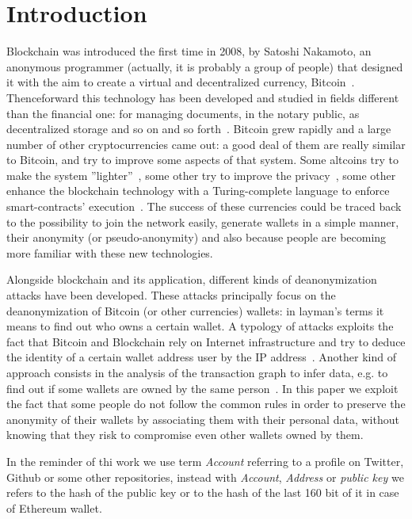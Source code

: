 \section{Introduction}
Blockchain was introduced the first time in 2008, by Satoshi Nakamoto, an
anonymous programmer (actually, it is probably a group of people) that
designed it with the aim to create a virtual and decentralized currency,
Bitcoin~\cite{bib:satoshi}.
Thenceforward this technology has been developed and
studied in fields different than the financial one: for managing documents, in
the notary public, as decentralized storage and so on and so
forth~\cite{bib:air}. Bitcoin grew
rapidly and a large number of other cryptocurrencies came out:
a good deal of them are really
similar to Bitcoin, and try to improve some aspects of that system. Some
altcoins try to make the system ''lighter''~\cite{bib:litecoin:wiki},
some other try to improve the privacy~\cite{bib:zerocoin:white_paper,
bib:zerocash:white_paper,
bib:monero:white_paper}, some other enhance the blockchain technology with a
Turing-complete language to enforce smart-contracts'
execution~\cite{bib:ethereum:whitepaper}.
The success of these
currencies could be traced back to the possibility to join the network easily,
generate wallets in a simple manner,
their anonymity (or pseudo-anonymity) and also because people are
becoming more familiar with these new technologies.


Alongside blockchain and its application, different kinds of deanonymization
attacks have been developed.
These attacks principally focus on the
deanonymization of Bitcoin (or other currencies) wallets: in layman's terms
it means to find out who owns a certain wallet.
A typology of attacks exploits the fact that Bitcoin and Blockchain rely
on Internet infrastructure and try to deduce the identity of a certain wallet
address user by the IP address~\cite{bib:deanon}.
Another kind of approach consists in the analysis of the transaction graph
to infer data, e.g. to find out if some wallets are owned by the same
person~\cite{bib:fistful}.
In this paper we exploit the fact that some people do not follow the common
rules in order to preserve the anonymity of their wallets by associating them
with their personal data, without knowing that they risk to compromise even
other wallets owned by them.

In the reminder of thi work we use term \emph{Account} referring to a profile
on Twitter, Github or some other repositories, instead with \emph{Account},
\emph{Address} or \emph{public key} we refers to the hash of the public key
or to the hash of the last 160 bit of it in case of Ethereum wallet.

